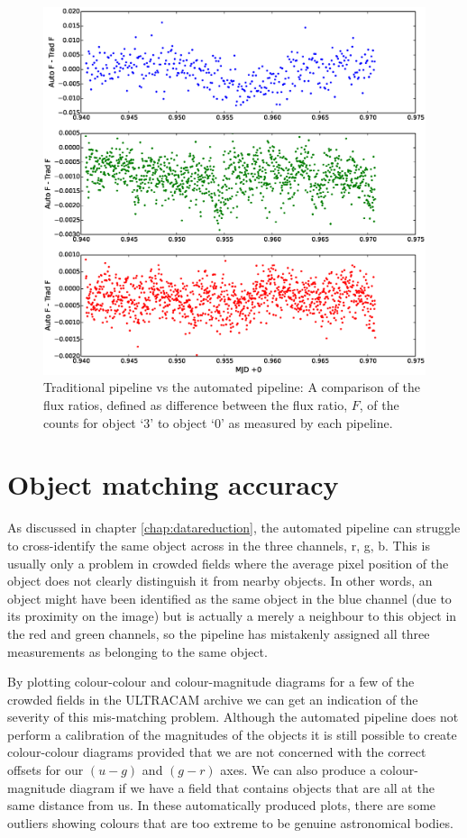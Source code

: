 \begin{figure}
\centering
\includegraphics[width=140mm]{images/difference-of-ratios.eps}
\caption{Traditional pipeline vs the automated pipeline: A comparison of the flux ratios, defined as difference between the flux ratio, $F$, of the counts for object `3' to object `0' as measured by each pipeline.}
\label{fig:difference-of-ratios}
\end{figure}


\section{Object matching accuracy}
As discussed in chapter \ref{chap:datareduction}, the automated pipeline can struggle to cross-identify the same object across in the three channels, r, g, b. This is usually only a problem in crowded fields where the average pixel position of the object does not clearly distinguish it from nearby objects. In other words, an object might have been identified as the same object in the blue channel (due to its proximity on the image) but is actually a merely a neighbour to this object in the red and green channels, so the pipeline has mistakenly assigned all three measurements as belonging to the same object.

By plotting colour-colour and colour-magnitude diagrams for a few of the crowded fields in the ULTRACAM archive we can get an indication of the severity of this mis-matching problem. Although the automated pipeline does not perform a calibration of the magnitudes of the objects it is still possible to create colour-colour diagrams provided that we are not concerned with the correct offsets for our $(u-g)$ and $(g-r)$ axes. We can also produce a colour-magnitude diagram if we have a field that contains objects that are all at the same distance from us. In these automatically produced plots, there are some outliers showing colours that are too extreme to be genuine astronomical bodies. 

